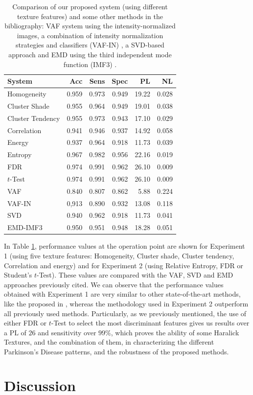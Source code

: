 \begin{table}[ht]
	\centering
	\begin{tabular}{l | rrrrr}
		\hline\hline
		\textbf{System}		& \textbf{Acc} 	& \textbf{Sens}	& \textbf{Spec}	& \textbf{PL}	& \textbf{NL}\\ 
		\hline
		Homogeneity & 0.959 & 0.973 & 0.949 & 19.22 & 0.028\\
		Cluster Shade & 0.955 & 0.964 & 0.949 & 19.01 & 0.038\\
		Cluster Tendency & 0.955 & 0.973 & 0.943 & 17.10 & 0.029\\
		Correlation & 0.941 & 0.946 & 0.937 & 14.92 & 0.058\\
		Energy & 0.937 & 0.964 & 0.918 & 11.73 & 0.039\\
		\hline
		Entropy	& 0.967	& 0.982	& 0.956	& 22.16	& 0.019 \\ %
		FDR	& 0.974	& 0.991	& 0.962	& 26.10	& 0.009 \\ %
		$t$-Test	& 0.974	& 0.991	& 0.962	& 26.10	& 0.009 \\ %
		\hline
		VAF & 0.840	& 0.807	& 0.862	& 5.88	& 0.224 \\
		VAF-IN & 0,913 & 0.890 & 0.932 & 13.08 & 0.118\\
		SVD & 0.940 & 0.962 & 0.918 & 11.73 & 0.041\\
		EMD-IMF3 & 0.950 & 0.951 & 0.948 & 18.28 & 0.051\\
		\hline\hline
	\end{tabular}
	\vspace{10pt}
	\caption{Comparison of our proposed system (using different texture features) and some other methods in the bibliography: VAF system using the intensity-normalized images,  a combination of intensity normalization strategies and classifiers (VAF-IN) \cite{Illan2012}, a SVD-based approach \cite{Segovia2012} and EMD using the third independent mode function (IMF3) \cite{Rojas2012}.}
	\label{tab:comparison}
\end{table}

In Table \ref{tab:comparison}, performance values at the operation point are shown for Experiment 1 (using five texture features: Homogeneity, Cluster shade, Cluster tendency, Correlation and energy) and for Experiment 2 (using Relative Entropy, FDR or Student's $t$-Test). These values are compared with the VAF, SVD and EMD approaches previously cited. We can observe that the performance values obtained with Experiment 1 are very similar to other state-of-the-art methods, like the proposed in \cite{Segovia2012,Rojas2012}, whereas the methodology used in Experiment 2 outperform all previously used methods. Particularly, as we previously mentioned, the use of either FDR or $t$-Test to select the most discriminant features gives us results over a PL of $26$ and sensitivity over $99\%$, which proves the ability of some Haralick Textures, and the combination of them, in characterizing the different Parkinson's Disease patterns, and the robustness of the proposed methods. 
\section{Discussion}